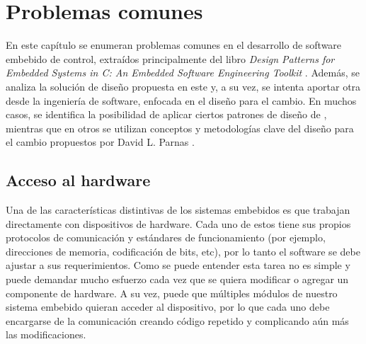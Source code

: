 

%
%
\chapter{Problemas comunes}

En este capítulo se enumeran problemas comunes en el desarrollo de software embebido de control, extraídos principalmente del libro \textit{Design Patterns for Embedded Systems in C: An Embedded Software Engineering Toolkit} \cite{douglass}. Además, se analiza la solución de diseño propuesta en este y, a su vez, se intenta aportar otra desde la ingeniería de software, enfocada en el diseño para el cambio. En muchos casos, se identifica la posibilidad de aplicar ciertos patrones de diseño de \cite{Gamma:1995:DPE:186897}, mientras que en otros se utilizan conceptos y metodologías clave del diseño para el cambio propuestos por David L. Parnas \cite{Parnas02,Parnas1972,parnas1977abstract}.


\minitoc



\section{Acceso al hardware}
\label{Accesoalhardware}
Una de las características distintivas de los sistemas embebidos es que trabajan directamente con dispositivos de hardware. Cada uno de estos tiene sus propios protocolos de comunicación y estándares de funcionamiento (por ejemplo, direcciones de memoria, codificación de bits, etc), por lo tanto el software se debe ajustar a sus requerimientos. Como se puede entender esta tarea no es simple y puede demandar mucho esfuerzo cada vez que se quiera modificar o agregar un componente de hardware. A su vez, puede que múltiples módulos de nuestro sistema embebido quieran acceder al dispositivo, por lo que cada uno debe encargarse de la comunicación creando código repetido y complicando aún más las modificaciones. 

